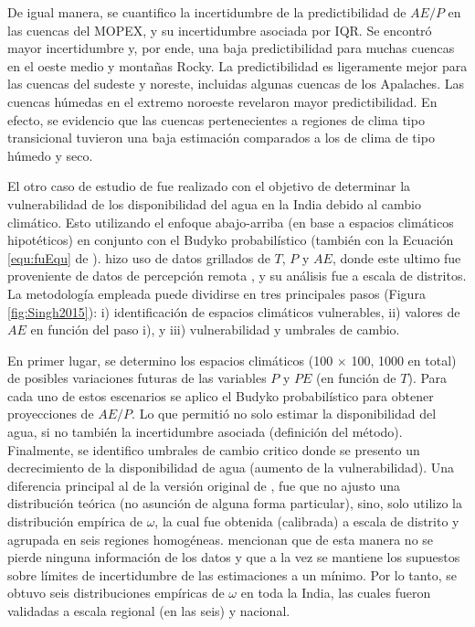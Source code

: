 \documentclass[12pt]{article}
\begin{document}
De igual manera, se cuantifico la incertidumbre de la predictibilidad de $AE/P$ en las cuencas del MOPEX, y su incertidumbre asociada por IQR. Se encontró mayor incertidumbre y, por ende, una baja predictibilidad para muchas cuencas en el oeste medio y montañas Rocky. La predictibilidad es ligeramente mejor para las cuencas del sudeste y noreste, incluidas algunas cuencas de los Apalaches. Las cuencas húmedas en el extremo noroeste revelaron mayor predictibilidad. En efecto, se evidencio que las cuencas pertenecientes a regiones de clima tipo transicional tuvieron una baja estimación comparados a los de clima de tipo húmedo y seco.

\clearpage


El otro caso de estudio de \citet{Singh2015} fue realizado con el objetivo de determinar la vulnerabilidad de los disponibilidad del agua en la India debido al cambio climático. Esto utilizando el enfoque abajo-arriba (en base a espacios climáticos hipotéticos) en conjunto con el Budyko probabilístico (también con la Ecuación \ref{equ:fuEqu} de \citet{Fu1981}). \citet{Singh2015} hizo uso de datos grillados de $T$, $P$ y $AE$, donde este ultimo fue proveniente de datos de percepción remota \citep{zhang2016review}, y su análisis fue a escala de distritos. La metodología empleada puede dividirse en tres principales pasos (Figura \ref{fig:Singh2015}): i) identificación de espacios climáticos vulnerables, ii) valores de $AE$ en función del paso i), y iii) vulnerabilidad y umbrales de cambio. 



En primer lugar, se determino los espacios climáticos (100 $\times$ 100, 1000 en total) de posibles variaciones futuras de las variables $P$ y $PE$ (en función de $T$). Para cada uno de estos escenarios se aplico el Budyko probabilístico para obtener proyecciones de $AE/P$. Lo que permitió no solo estimar la disponibilidad del agua, si no también la incertidumbre asociada (definición del método). Finalmente, se identifico umbrales de cambio critico donde se presento un decrecimiento de la disponibilidad de agua (aumento de la vulnerabilidad). Una diferencia principal al de la versión original de \citet{Greve2015}, fue que \citet{Singh2015} no ajusto una distribución teórica (no asunción de alguna forma particular), sino, solo utilizo la distribución empírica de $\omega$, la cual fue obtenida (calibrada) a escala de distrito y agrupada en seis regiones homogéneas. \citet{Singh2015} mencionan que de esta manera no se pierde ninguna información de los datos y que a la vez se mantiene los supuestos sobre límites de incertidumbre de las estimaciones a un mínimo. Por lo tanto, se obtuvo seis distribuciones empíricas de $\omega$ en toda la India, las cuales fueron validadas a escala regional (en las seis) y nacional.
\end{document}
